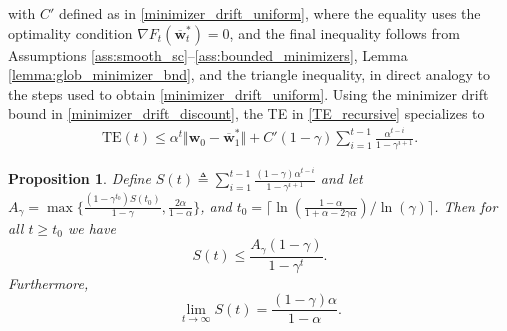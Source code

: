 \documentclass[conference]{IEEEtran}
\newcommand{\egl}[1]{{\color{blue}\bf{[EGL: #1]}}}
\newcommand{\fraz}[1]{\textcolor{purple}{\bf [Fraz: #1]}}
\newcommand{\nm}[1]{\textcolor{magenta}{\bf [NM: #1]}}
\newtheorem{prop}{Proposition}
\begin{document}
with $C'$ defined as in \eqref{minimizer_drift_uniform}, where the equality uses the optimality condition $\nabla F_t(\overline{\mathbf{w}}^*_t)=0$, and the final
inequality follows from Assumptions \ref{ass:smooth_sc}–\ref{ass:bounded_minimizers}, Lemma \ref{lemma:glob_minimizer_bnd}, and the triangle inequality, in direct analogy to the steps used to obtain \eqref{minimizer_drift_uniform}. Using the minimizer drift bound in \eqref{minimizer_drift_discount}, the TE in \eqref{TE_recursive} specializes to
\begin{align}
    \text{TE}(t)\leq \alpha^{t}\Vert \mathbf{w}_{0} - \overline{\mathbf{w}}^*_{1}\Vert + C' (1-\gamma)\sum_{i=1}^{t-1} \frac{\alpha^{t-i}}{1-\gamma^{i+1}}.
    \label{discount_TE}
\end{align}
\begin{prop}
\label{prop:discount_sum}
Define $S(t) \triangleq \sum_{i=1}^{t-1}  \frac{(1-\gamma)\alpha^{t-i}}{1 - \gamma^{i+1}
    }$ and let $A_\gamma=\max\{\frac{(1-\gamma^{t_0})S(t_0)}{1-\gamma}, \frac{2\alpha}{1-\alpha}\}$, and  $ t_0= \lceil\ln(\frac{1-\alpha}{1+\alpha-2\gamma\alpha})/\ln(\gamma)\rceil$. Then for all $t\geq t_0 $ we have     
$$ S(t) \leq \frac{A_\gamma(1-\gamma)}{1-\gamma^t}. $$ 
Furthermore, $$\lim_{t \to \infty} S(t) = \frac{(1-\gamma)\alpha}{1-\alpha}.$$
\end{prop}
\end{document}
